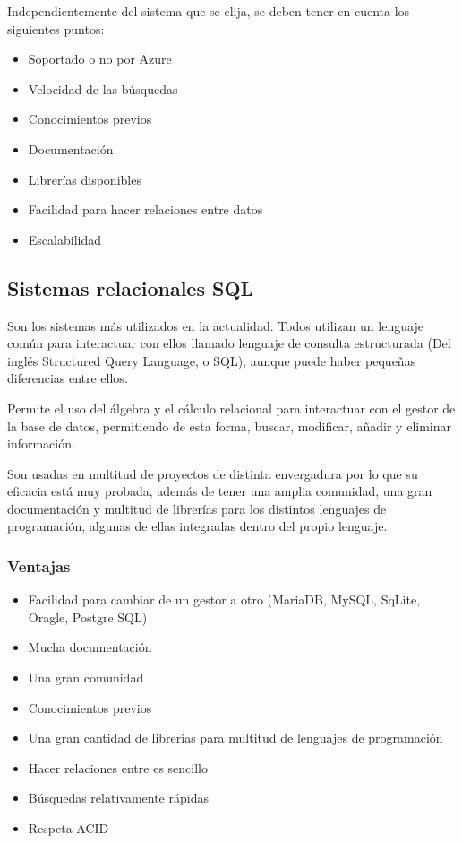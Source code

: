 Independientemente del sistema que se elija, se deben tener en cuenta los siguientes puntos:

\begin{itemize}
    \item Soportado o no por Azure
    \item Velocidad de las búsquedas
    \item Conocimientos previos
    \item Documentación
    \item Librerías disponibles 
    \item Facilidad para hacer relaciones entre datos
    \item Escalabilidad
\end{itemize}

\subsection{Sistemas relacionales SQL}

Son los sistemas más utilizados en la actualidad. Todos utilizan un lenguaje común para interactuar con ellos llamado lenguaje de consulta estructurada (Del inglés Structured Query Language, o SQL), aunque puede haber pequeñas diferencias entre ellos. 

Permite el uso del álgebra y el cálculo relacional para interactuar con el gestor de la base de datos, permitiendo de esta forma, buscar, modificar, añadir y eliminar información. 

Son usadas en multitud de proyectos de distinta envergadura por lo que su eficacia está muy probada, además de tener una amplia comunidad, una gran documentación y multitud de librerías para los distintos lenguajes de programación, algunas de ellas integradas dentro del propio lenguaje. 

\subsubsection{Ventajas}
\begin{itemize}
    \item Facilidad para cambiar de un gestor a otro (MariaDB, MySQL, SqLite, Oragle, Postgre SQL)
    \item Mucha documentación
    \item Una gran comunidad
    \item Conocimientos previos
    \item Una gran cantidad de librerías para multitud de lenguajes de programación
    \item Hacer relaciones entre es sencillo
    \item Búsquedas relativamente rápidas
    \item Respeta ACID
\end{itemize}

